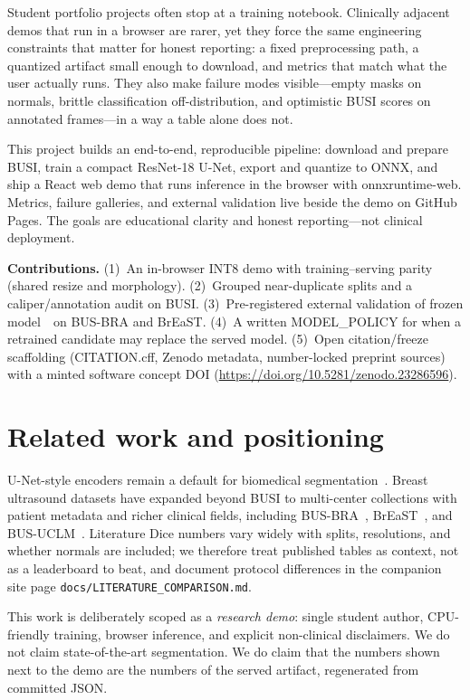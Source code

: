 \documentclass[11pt,a4paper]{article}
\begin{document}
Student portfolio projects often stop at a training notebook. Clinically adjacent demos that
run in a browser are rarer, yet they force the same engineering constraints that matter for
honest reporting: a fixed preprocessing path, a quantized artifact small enough to download,
and metrics that match what the user actually runs. They also make failure modes visible---empty
masks on normals, brittle classification off-distribution, and optimistic BUSI scores on
annotated frames---in a way a table alone does not.

This project builds an end-to-end, reproducible pipeline: download and prepare BUSI, train a
compact ResNet-18 U-Net, export and quantize to ONNX, and ship a React web demo that runs
inference in the browser with onnxruntime-web. Metrics, failure galleries, and external
validation live beside the demo on GitHub Pages. The goals are educational clarity and honest
reporting---not clinical deployment.

\textbf{Contributions.}
(1)~An in-browser INT8 demo with training--serving parity (shared resize and morphology).
(2)~Grouped near-duplicate splits and a caliper/annotation audit on BUSI.
(3)~Pre-registered external validation of frozen model~\MetricModelVersion\ on BUS-BRA and BrEaST.
(4)~A written MODEL\_POLICY for when a retrained candidate may replace the served model.
(5)~Open citation/freeze scaffolding (CITATION.cff, Zenodo metadata, number-locked preprint
sources) with a minted software concept DOI (\url{https://doi.org/10.5281/zenodo.23286596}).

\section{Related work and positioning}

U-Net-style encoders remain a default for biomedical segmentation~\cite{ronneberger2015unet}.
Breast ultrasound datasets have expanded beyond BUSI to multi-center collections with patient
metadata and richer clinical fields, including BUS-BRA~\cite{gomezflores2024busbra},
BrEaST~\cite{pawlowska2024breast}, and BUS-UCLM~\cite{vallez2025busuclm}. Literature Dice
numbers vary widely with splits, resolutions, and whether normals are included; we therefore
treat published tables as context, not as a leaderboard to beat, and document protocol
differences in the companion site page \texttt{docs/LITERATURE\_COMPARISON.md}.

This work is deliberately scoped as a \emph{research demo}: single student author, CPU-friendly
training, browser inference, and explicit non-clinical disclaimers. We do not claim
state-of-the-art segmentation. We do claim that the numbers shown next to the demo are the
numbers of the served artifact, regenerated from committed JSON.
\end{document}
